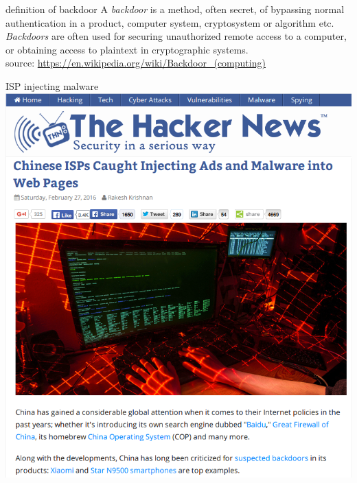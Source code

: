 \documentclass[11pt]{beamer}
\begin{document}
\begin{frame}{definition of backdoor}
A \emph{backdoor} is a method, often secret, of bypassing normal authentication in a product, computer system, cryptosystem or algorithm etc.
\\[0.2cm]
\emph{Backdoors} are often used for securing unauthorized remote access to a computer, or obtaining access to plaintext in cryptographic systems.
\\[0.2cm]
source: \href{https://en.wikipedia.org/wiki/Backdoor\textunderscore(computing)}{https://en.wikipedia.org/wiki/Backdoor\_(computing)}
\end{frame}

\begin{frame}{ISP injecting malware}
\includegraphics[scale=0.28]{isp_malware.png}
\end{frame}
\end{document}
